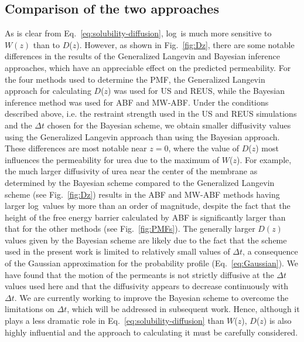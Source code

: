 \subsection*{Comparison of the two approaches}
As is clear from Eq.~\ref{eq:solubility-diffusion}, log\perm~is much more sensitive to $W(z)$ than to $D$($z$).
However, as shown in Fig.~\ref{fig:Dz}, there are some notable differences
in the results of the Generalized Langevin and Bayesian inference approaches, which
have an appreciable effect on the predicted permeability.
For the four methods used to determine the PMF, the Generalized Langevin approach 
for calculating $D$($z$) was used for US and REUS, while the Bayesian inference method 
was used for ABF and MW-ABF.
Under the conditions described above, i.e. the restraint strength used in the US and REUS
simulations and the $\Delta t$ chosen for the Bayesian scheme,
we obtain smaller diffusivity values using
the Generalized Langevin approach than using the Bayesian approach.
These differences are most notable near $z=0$, where the value of $D$($z$)
most influences the permeability for urea due to the maximum of $W$($z$).
For example, the much larger diffusivity of urea
near the center of the membrane as determined by the Bayesian scheme
compared to the Generalized Langevin scheme (see Fig.~\ref{fig:Dz}) 
results in the ABF and MW-ABF methods having larger log\perm~values by more than
an order of magnitude, despite the fact that the
height of the free energy barrier calculated by ABF is significantly
larger than that for the other methods (see Fig.~\ref{fig:PMFs}).
{\color{red} The generally larger $D(z)$ values given by 
the Bayesian scheme are likely due to the fact that
the scheme used in the present work is limited to relatively small values of $\Delta t$, a consequence of the Gaussian approximation for the probability profile (Eq.~\ref{eq:Gaussian}). We have found that the motion of the permeants is not strictly diffusive at the $\Delta t$ values used here and that the diffusivity appears to decrease continuously with $\Delta t$. We are currently working to improve the Bayesian scheme to overcome the limitations on $\Delta t$, which will be addressed in subsequent work.}
Hence, although it plays a less dramatic role in Eq.~\ref{eq:solubility-diffusion} than $W$($z$),
$D$($z$) is also highly influential and the approach to calculating it must be
carefully considered.





